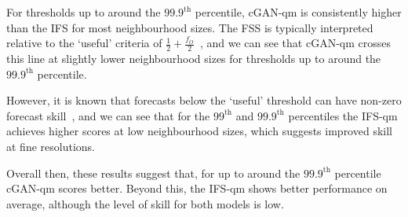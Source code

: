 \documentclass{article}
\begin{document}
For thresholds up to around the $99.9^{\text{th}}$ percentile, cGAN-qm is consistently higher than the IFS for most neighbourhood sizes.
The FSS is typically interpreted relative to the `useful' criteria of $\frac{1}{2} + \frac{f_O}{2}$~\cite{roberts_scale-selective_2008}, and we can see that cGAN-qm crosses this line at slightly lower neighbourhood sizes for thresholds up to around the $99.9^{\text{th}}$ percentile.

However, it is known that forecasts below the `useful' threshold can have non-zero forecast skill~\citep{nachamkin_applying_2015, mittermaier_long-term_2013}, and we can see that for the $99^{\text{th}}$ and $99.9^{\text{th}}$ percentiles the IFS-qm achieves higher scores at low neighbourhood sizes, which suggests improved skill at fine resolutions. 

Overall then, these results suggest that, for up to around the $99.9^{\text{th}}$ percentile cGAN-qm scores better. Beyond this, the IFS-qm shows better performance on average, although the level of skill for both models is low.
\end{document}
